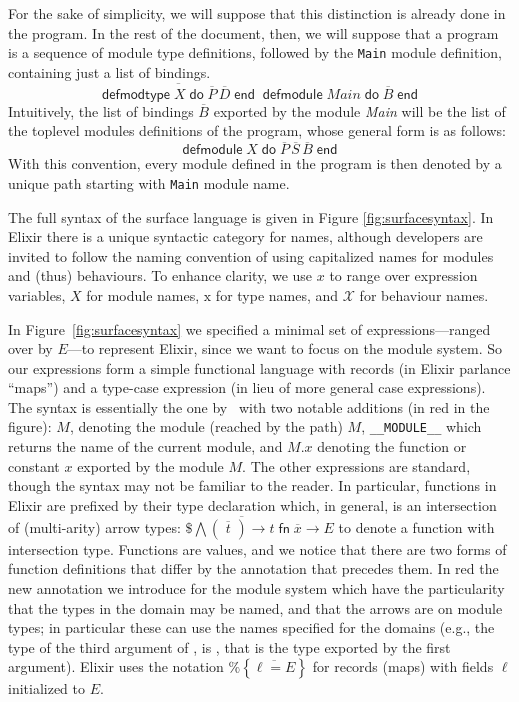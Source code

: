 \documentclass[a4paper,10pt]{article}
\DeclareMathOperator{\kwdefmt}{\textsf{defmodtype}}
\DeclareMathOperator{\kwend}{\textsf{end}}
\DeclareMathOperator{\kwdo}{\textsf{do}}
\DeclareMathOperator{\kwdefm}{\textsf{defmodule}}
\DeclareMathOperator{\kwfn}{\textsf{fn}}
\newcommand{\tx}{\textrm{x}}
\newcommand{\self}{\texttt{\_\_MODULE\_\_}}
\begin{document}
For the sake of simplicity, we will suppose that this distinction is already done in the program. In the rest of the document, then, we will suppose that a program is a sequence of module type definitions, followed by the \texttt{Main} module definition, containing just a list of bindings. 
\[\overline{\kwdefmt X \kwdo \overline{P}\, \overline{D} \kwend}\kwdefm \textit{Main} \kwdo \overline{B} \kwend\]
Intuitively, the list of bindings $\overline{B}$ exported by the module \textit{Main} will be the list of the toplevel modules definitions of the program, whose general form is as follows: 
\begin{equation}\label{eq:module}
\kwdefm X \kwdo \overline{P}\, \overline{S}\, \overline{B} \kwend
\end{equation}
With this convention, every module defined in the program is then denoted by a unique path starting with \texttt{Main} module name.

The full syntax of the surface language is given in Figure \ref{fig:surfacesyntax}. In Elixir there is a unique syntactic category for names, although developers are invited to follow the naming convention of using capitalized names for modules and (thus) behaviours. To enhance clarity, we use $x$ to range over expression variables, $X$ for module names, $\tx$ for type names, and $\mathcal X$ for behaviour names. 

In Figure~\ref{fig:surfacesyntax} we specified a minimal set of expressions---ranged over by $E$---to represent Elixir, since we want to focus on the module system. So our expressions form a simple functional language with records (in Elixir parlance ``maps'') and a type-case expression (in lieu of more general case expressions). The syntax is essentially the one by~\cite{CDV24} with two notable additions (in red in the figure): $M$, denoting the module (reached by the path) $M$, \self{} which returns the name of the current module, and $M.x$ denoting the function or constant $x$ exported by the module $M$. The other expressions are standard, though the syntax may not be familiar to the reader. In particular, functions in Elixir are prefixed by their type declaration which, in general, is an intersection of (multi-arity) arrow types: $\$\bigwedge \overline{(\,\overline{\,t\,}\,)\rightarrow t} \kwfn \overline{x} \rightarrow E$ to denote a function with intersection type. Functions are values, and we notice that there are two forms of function definitions that differ by the annotation that precedes them. In red the new annotation we introduce for the module system which have the particularity that the types in the domain may be named, and that the arrows are on module types; in particular these can use the names specified for the domains (e.g., the type of the third argument of , is , that is the  type exported by the first argument). Elixir uses the notation $\texttt{\%}\!\left\{\overline{\ell=E}\right\}$ for records (maps) with fields $\ell$ initialized to $E$. 
\end{document}
